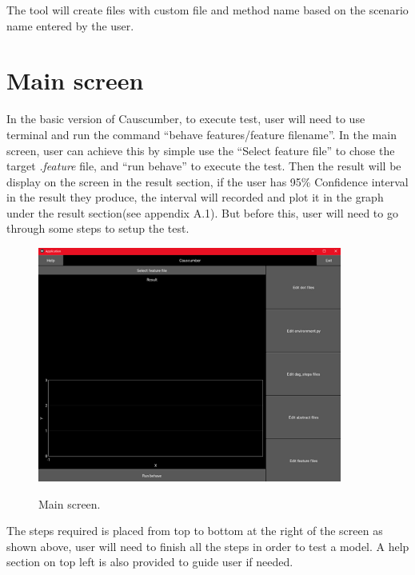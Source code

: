 \noindent 
The tool will create files with custom file and method name based on the scenario name entered by the user.

\section{Main screen}
In the basic version of Causcumber, to execute test, user will need to use terminal and run the command “behave features/{feature filename}”. In the main screen, user can achieve this by simple use the “Select feature file” to chose the target \textsl{.feature} file, and “run behave” to execute the test. Then the result will be display on the screen in the result section, if the user has 95\% Confidence interval in the result they produce, the interval will recorded and plot it in the graph under the result section(see appendix A.1). But before this, user will need to go through some steps to setup the test.
\begin{figure}[H]
	\centering
	\includegraphics[width=10cm]{figures/mainScreen.png}\\
	\caption{Main screen.}
	\label{fig:figure12}
\end{figure}
\noindent 
The steps required is placed from top to bottom at the right of the screen as shown above, user will need to finish all the steps in order to test a model. A help section on top left is also provided to guide user if needed.


